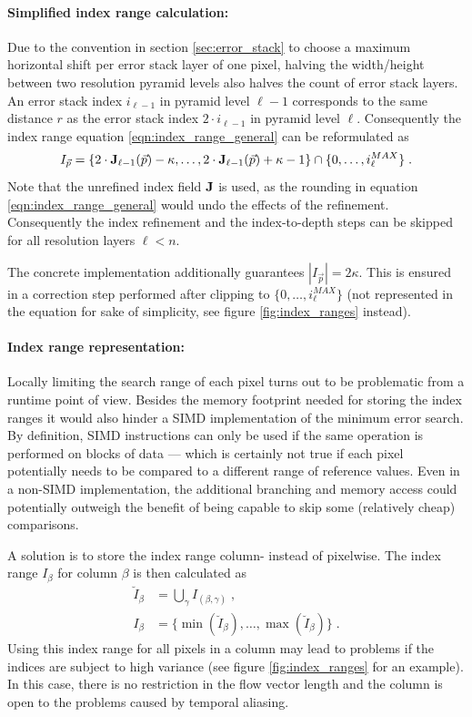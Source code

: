 \paragraph{Simplified index range calculation:} Due to the convention in section \ref{sec:error_stack} to choose a maximum horizontal shift per error stack layer of one pixel, halving the width/height between two resolution pyramid levels also halves the count of error stack layers. An error stack index $i_{\ell - 1}$ in pyramid level $\ell - 1$ corresponds to the same distance $r$ as the error stack index $2  \cdot i_{\ell - 1}$ in pyramid level $\ell$. Consequently the index range equation \ref{eqn:index_range_general} can be reformulated as 
\begin{equation}
 I_{\vec p} = \{2 \cdot \img{J}_{\ell - 1}(\vec p) - \kappa, \ldots, 2 \cdot \img{J}_{\ell - 1}(\vec p) + \kappa - 1\} \cap \{0, \ldots, i^{MAX}_\ell\}
 \label{eqn:index_range} \;.
\end{equation}
Note that the unrefined index field $\mathbf{J}$ is used, as the rounding in equation \ref{eqn:index_range_general} would undo the effects of the refinement. Consequently the index refinement and the index-to-depth steps can be skipped for all resolution layers $\ell < n$.

The concrete implementation additionally guarantees $|I_{\vec p}| = 2\kappa$. This is ensured in a correction step performed after clipping to $\{0, \ldots, i_\ell^{MAX} \}$ (not represented in the equation for sake of simplicity, see figure \ref{fig:index_ranges} instead).

\paragraph{Index range representation:}

Locally limiting the search range of each pixel turns out to be problematic from a runtime point of view. Besides the memory footprint needed for storing the index ranges it would also hinder a SIMD implementation of the minimum error search. By definition, SIMD instructions can only be used if the same operation is performed on blocks of data --- which is certainly not true if each pixel potentially needs to be compared to a different range of reference values. Even in a non-SIMD implementation, the additional branching and memory access could potentially outweigh the benefit of being capable to skip some (relatively cheap) comparisons.

A solution is to store the index range column- instead of pixelwise. The index range $I_\beta$ for column $\beta$ is then calculated as
\begin{align}
 \breve I_{\beta} &= \bigcup_{\gamma} I_{(\beta, \gamma)} \label{eqn:index_range_column_cup} \; , \\
 I_{\beta} &= \{\min(\breve I_{\beta}), \ldots, \max(\breve I_{\beta})\label{eqn:index_range_column}\} \; .
\end{align}
Using this index range for all pixels in a column may lead to problems if the indices are subject to high variance (see figure \ref{fig:index_ranges} for an example). In this case, there is no restriction in the flow vector length and the column is open to the problems caused by temporal aliasing.

